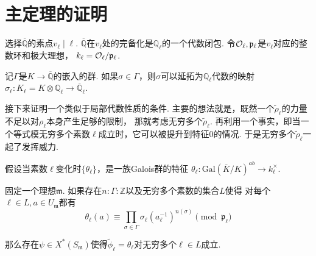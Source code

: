 \section{主定理的证明}

选择$\overline{\mathbb{Q}}$的素点$v_{\ell} \mid \ell$.
$\overline{\mathbb{Q}}$在$v_{\ell}$处的完备化是$\mathbb{Q}_{\ell}$的一个代数闭包.
令$\mathcal{O}_{\ell}, \mathfrak{p}_{\ell}$是$v_{\ell}$对应的整数环和极大理想，
$k_{\ell} = \mathcal{O}_{\ell} / \mathfrak{p}_{\ell}$.

记$\Gamma$是$K\to \overline{\mathbb{Q}}$的嵌入的群.
如果$\sigma\in \Gamma$，则$\sigma$可以延拓为$\mathbb{Q}_{\ell}$代数的映射
$\sigma_{\ell}: K_{\ell} = K\otimes \mathbb{Q}_{\ell}\to \overline{\mathbb{Q}}_{\ell}$.

接下来证明一个类似于局部代数性质的条件.
主要的想法就是，既然一个$\tilde{\rho}_{\ell}$的力量不足以对$\rho_{\ell}$本身产生足够的限制，
那就考虑无穷多个$\tilde{\rho}_{\ell}$.
再利用一个事实，即当一个等式模无穷多个素数$\ell$成立时，它可以被提升到特征$0$的情况.
于是无穷多个$\tilde{\rho}_{\ell}$一起了发挥威力.

假设当素数$\ell$变化时$\{\theta_{\ell}\}$，是一族Galois群的特征
$\theta_{\ell}: \mathrm{Gal}(\overline{K}/K)^{ab}\to k_{\ell}^{\times}$.

\begin{cprop}
    固定一个理想$\mathfrak{m}$.
    如果存在$n:\Gamma: \mathbb{Z}$以及无穷多个素数的集合$L$使得
    对每个$\ell\in L, a\in U_{\mathfrak{m}}$都有
    \begin{equation}
        \theta_{\ell}(a) \equiv \prod_{\sigma\in \Gamma} \sigma_{\ell}(a_{\ell}^{-1})^{n(\sigma)} \pmod{\mathfrak{p}_{\ell}}
    \end{equation}

    那么存在$\psi\in X^{*}(S_{\mathfrak{m}})$使得$\tilde{\phi}_{\ell} = \theta_{\ell}$对无穷多个$\ell\in L$成立.
\end{cprop}

